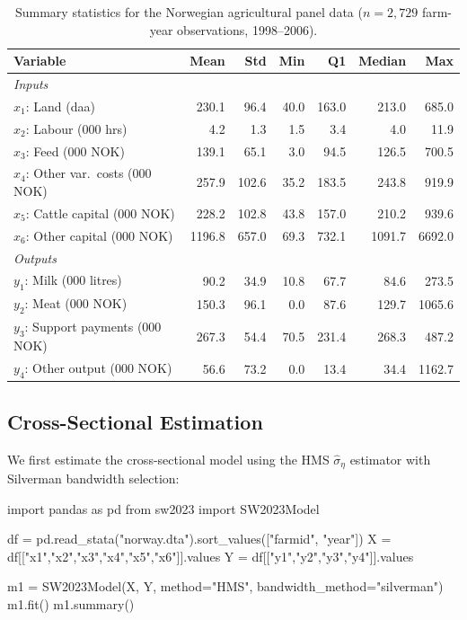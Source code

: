 \documentclass[article]{jss}
\begin{document}
\begin{table}[t]
\centering
\caption{Summary statistics for the Norwegian agricultural panel data
($n = 2{,}729$ farm-year observations, 1998--2006).}
\label{tab:norway_stats}
\begin{tabular}{lrrrrrr}
\hline
Variable & Mean & Std & Min & Q1 & Median & Max \\
\hline
\multicolumn{7}{l}{\textit{Inputs}} \\
$x_1$: Land (daa)            & 230.1 &  96.4 &  40.0 & 163.0 & 213.0 &  685.0 \\
$x_2$: Labour (000 hrs)      &   4.2 &   1.3 &   1.5 &   3.4 &   4.0 &   11.9 \\
$x_3$: Feed (000 NOK)        & 139.1 &  65.1 &   3.0 &  94.5 & 126.5 &  700.5 \\
$x_4$: Other var.\ costs (000 NOK) & 257.9 & 102.6 &  35.2 & 183.5 & 243.8 & 919.9 \\
$x_5$: Cattle capital (000 NOK) & 228.2 & 102.8 &  43.8 & 157.0 & 210.2 & 939.6 \\
$x_6$: Other capital (000 NOK) & 1196.8 & 657.0 &  69.3 & 732.1 & 1091.7 & 6692.0 \\
\multicolumn{7}{l}{\textit{Outputs}} \\
$y_1$: Milk (000 litres)     &  90.2 &  34.9 &  10.8 &  67.7 &  84.6 &  273.5 \\
$y_2$: Meat (000 NOK)        & 150.3 &  96.1 &   0.0 &  87.6 & 129.7 & 1065.6 \\
$y_3$: Support payments (000 NOK) & 267.3 &  54.4 &  70.5 & 231.4 & 268.3 &  487.2 \\
$y_4$: Other output (000 NOK) &  56.6 &  73.2 &   0.0 &  13.4 &  34.4 & 1162.7 \\
\hline
\end{tabular}
\end{table}

\subsection[Cross-sectional estimation]{Cross-Sectional Estimation}

We first estimate the cross-sectional model using the HMS $\hat\sigma_\eta$
estimator with Silverman bandwidth selection:

\begin{Code}
import pandas as pd
from sw2023 import SW2023Model

df = pd.read_stata("norway.dta").sort_values(["farmid", "year"])
X = df[["x1","x2","x3","x4","x5","x6"]].values
Y = df[["y1","y2","y3","y4"]].values

m1 = SW2023Model(X, Y, method="HMS", bandwidth_method="silverman")
m1.fit()
m1.summary()
\end{Code}
\end{document}
